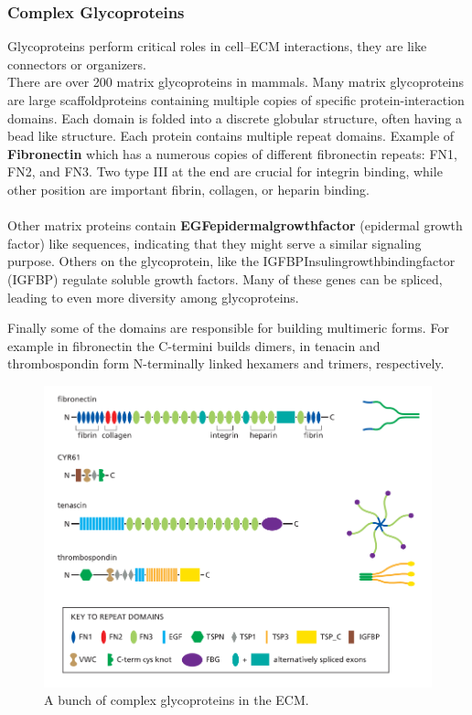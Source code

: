 \documentclass[../main.tex]{subfiles}
\begin{document}
\subsubsection{Complex Glycoproteins}
Glycoproteins perform critical roles in cell–ECM interactions, they are like connectors or organizers.\\
There are over 200 matrix glycoproteins in mammals. Many matrix glycoproteins are large \gls{scaffoldproteins} containing multiple copies of specific protein-interaction domains. Each domain is folded into a discrete globular structure, often having a bead like structure. Each protein contains multiple repeat domains. 
Example of \textbf{Fibronectin} which has a numerous copies of different \gls{fibronectin} repeats: \gls{FN1}, \gls{FN2}, and \gls{FN3}. Two type III at the end are crucial for integrin binding, while other position are important fibrin, collagen, or heparin binding.\\
\\ 
Other matrix proteins contain \textbf{\gls{EGFepidermalgrowthfactor}} (epidermal growth factor) like sequences, indicating that they might serve a similar signaling purpose. Others on the glycoprotein, like the \gls{IGFBPInsulingrowthbindingfactor} (IGFBP) regulate soluble growth factors. Many of these genes can be spliced, leading to even more diversity among glycoproteins.

Finally some of the domains are responsible for building multimeric forms. For example in fibronectin the C-termini builds dimers, in \gls{tenacin} and \gls{thrombospondin} form N-terminally linked hexamers and trimers, respectively.

\begin{figure}[H]
	\centering
	\includegraphics[width=0.6\linewidth]{glyc_comp}
	\caption{A bunch of complex glycoproteins in the ECM.}
	\label{fig:glyccomp}
\end{figure}
\end{document}
